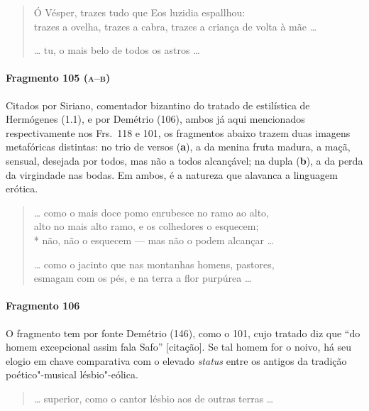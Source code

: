 \begin{verse}
Ó Vésper, trazes tudo que Eos luzidia espallhou:\\ %
trazes a ovelha, trazes a cabra, trazes a criança de volta à mãe \ldots{}

\ast\quad\ast\quad\ast

\ldots{} tu, o mais belo de todos os astros \ldots{} 
\end{verse}


\paragraph{Fragmento 105 (\textsc{a--b})}

{\small Citados por Siriano, comentador bizantino do tratado de estilística de
Hermógenes (1.1), e por Demétrio (106), ambos já aqui mencionados respectivamente nos Frs.~118 e 101, os fragmentos abaixo trazem duas imagens metafóricas distintas: no trio de versos (\textbf{a}), a da menina fruta madura, a maçã, sensual, desejada por todos,
mas não a todos alcançável; na dupla (\textbf{b}), a da perda da virgindade nas bodas.
Em ambos, é a natureza que alavanca a linguagem erótica.}

\begin{verse}
\ldots{} como o mais doce pomo enrubesce no ramo ao alto,\\
alto no mais alto ramo, e os colhedores o esquecem;\\*
não, não o esquecem --- mas não o podem alcançar \ldots{}

\ast\quad\ast\quad\ast

\ldots{} como o jacinto que nas montanhas homens, pastores,\\
esmagam com os pés, e na terra a flor purpúrea \ldots{}
\end{verse}

\paragraph{Fragmento 106}

{\small O fragmento tem por fonte Demétrio (146), como o 101, cujo tratado diz que
``do homem excepcional assim fala Safo” [citação]. Se tal homem for o
noivo, há seu elogio em chave comparativa com o elevado \textit{status}
entre os antigos da tradição poético"-musical lésbio"-eólica.}

\begin{verse}
\ldots{} superior, como o cantor lésbio aos de outras terras \ldots{}
\end{verse}

